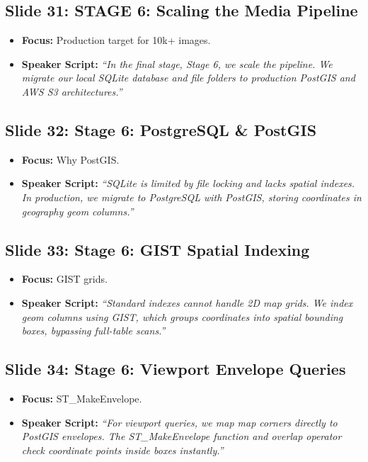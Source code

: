 \documentclass[11pt]{article}
\begin{document}
\subsection{Slide 31: STAGE 6: Scaling the Media Pipeline}
\begin{itemize}
    \item \textbf{Focus:} Production target for 10k+ images.
    \item \textbf{Speaker Script:} 
    \textit{``In the final stage, Stage 6, we scale the pipeline. We migrate our local SQLite database and file folders to production PostGIS and AWS S3 architectures.''}
\end{itemize}

\subsection{Slide 32: Stage 6: PostgreSQL \& PostGIS}
\begin{itemize}
    \item \textbf{Focus:} Why PostGIS.
    \item \textbf{Speaker Script:} 
    \textit{``SQLite is limited by file locking and lacks spatial indexes. In production, we migrate to PostgreSQL with PostGIS, storing coordinates in geography geom columns.''}
\end{itemize}

\subsection{Slide 33: Stage 6: GIST Spatial Indexing}
\begin{itemize}
    \item \textbf{Focus:} GIST grids.
    \item \textbf{Speaker Script:} 
    \textit{``Standard indexes cannot handle 2D map grids. We index geom columns using GIST, which groups coordinates into spatial bounding boxes, bypassing full-table scans.''}
\end{itemize}

\subsection{Slide 34: Stage 6: Viewport Envelope Queries}
\begin{itemize}
    \item \textbf{Focus:} ST_MakeEnvelope.
    \item \textbf{Speaker Script:} 
    \textit{``For viewport queries, we map map corners directly to PostGIS envelopes. The ST\_MakeEnvelope function and overlap operator check coordinate points inside boxes instantly.''}
\end{itemize}
\end{document}
